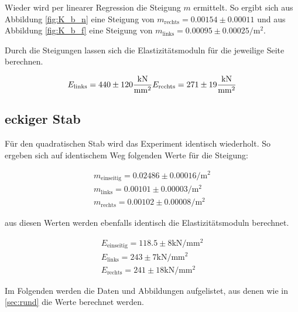 \noindent Wieder wird per linearer Regression die Steigung $m$ ermittelt. So ergibt sich aus Abbildung \ref{fig:K_b_n} eine Steigung
von $m_\text{rechts}=0.00154 \pm 0.00011$ und aus Abbildung \ref{fig:K_b_f} eine Steigung von 
$m_\text{links}=0.00095\pm0.00025\unit{\per \meter \squared}$.

\noindent Durch die Steigungen lassen sich die Elastizitätsmoduln für die jeweilige Seite berechnen.

\begin{equation}
    E_\text{links} = 440 \pm 120 \unit{\kilo \newton \per \milli \meter \squared} \\
    E_\text{rechts} = 271 \pm 19 \unit{\kilo \newton \per \milli \meter \squared}
\end{equation}


\subsection{eckiger Stab}
Für den quadratischen Stab wird das Experiment identisch wiederholt. 
So ergeben sich auf identischem Weg folgenden Werte für die Steigung:

\begin{align}
    m_\text{einseitig} = 0.02486 \pm 0.00016\unit{\per \meter \squared}  \\
    m_\text{links} = 0.00101\pm0.00003\unit{\per \meter \squared}        \\
    m_\text{rechts} = 0.00102\pm0.00008\unit{\per \meter \squared}
\end{align}

\noindent aus diesen Werten werden ebenfalls identisch die Elastizitätsmoduln berechnet.

\begin{align}
    E_\text{einseitig} =118.5   \pm 8\unit{\kilo \newton \per \milli \meter \squared}    \\
    E_\text{links} =    243    \pm 7\unit{\kilo \newton \per \milli \meter \squared}     \\
    E_\text{rechts} =   241    \pm 18\unit{\kilo \newton \per \milli \meter \squared}    
\end{align}

\noindent Im Folgenden werden die Daten und Abbildungen aufgelistet, aus denen wie in \autoref{sec:rund} die Werte berechnet werden.

